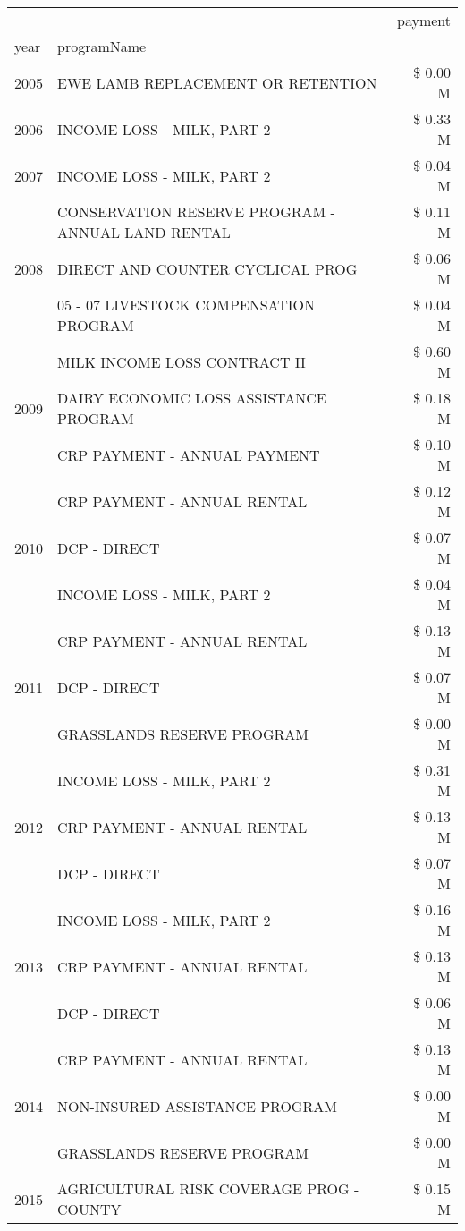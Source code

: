 \begin{tabular}{llr}
\toprule
 &  & payment \\
year & programName &  \\
\midrule
2005 & EWE LAMB REPLACEMENT OR RETENTION & \$ 0.00 M \\
\cline{1-3}
2006 & INCOME LOSS - MILK, PART 2 & \$ 0.33 M \\
\cline{1-3}
2007 & INCOME LOSS - MILK, PART 2 & \$ 0.04 M \\
\cline{1-3}
\multirow[t]{3}{*}{2008} & CONSERVATION RESERVE PROGRAM - ANNUAL LAND RENTAL & \$ 0.11 M \\
 & DIRECT AND COUNTER CYCLICAL PROG & \$ 0.06 M \\
 & 05 - 07 LIVESTOCK COMPENSATION PROGRAM & \$ 0.04 M \\
\cline{1-3}
\multirow[t]{3}{*}{2009} & MILK INCOME LOSS CONTRACT II & \$ 0.60 M \\
 & DAIRY ECONOMIC LOSS ASSISTANCE PROGRAM & \$ 0.18 M \\
 & CRP PAYMENT - ANNUAL PAYMENT & \$ 0.10 M \\
\cline{1-3}
\multirow[t]{3}{*}{2010} & CRP PAYMENT - ANNUAL RENTAL & \$ 0.12 M \\
 & DCP - DIRECT & \$ 0.07 M \\
 & INCOME LOSS - MILK, PART 2 & \$ 0.04 M \\
\cline{1-3}
\multirow[t]{3}{*}{2011} & CRP PAYMENT - ANNUAL RENTAL & \$ 0.13 M \\
 & DCP - DIRECT & \$ 0.07 M \\
 & GRASSLANDS RESERVE PROGRAM & \$ 0.00 M \\
\cline{1-3}
\multirow[t]{3}{*}{2012} & INCOME LOSS - MILK, PART 2 & \$ 0.31 M \\
 & CRP PAYMENT - ANNUAL RENTAL & \$ 0.13 M \\
 & DCP - DIRECT & \$ 0.07 M \\
\cline{1-3}
\multirow[t]{3}{*}{2013} & INCOME LOSS - MILK, PART 2 & \$ 0.16 M \\
 & CRP PAYMENT - ANNUAL RENTAL & \$ 0.13 M \\
 & DCP - DIRECT & \$ 0.06 M \\
\cline{1-3}
\multirow[t]{3}{*}{2014} & CRP PAYMENT - ANNUAL RENTAL & \$ 0.13 M \\
 & NON-INSURED ASSISTANCE PROGRAM & \$ 0.00 M \\
 & GRASSLANDS RESERVE PROGRAM & \$ 0.00 M \\
\cline{1-3}
\multirow[t]{3}{*}{2015} & AGRICULTURAL RISK COVERAGE PROG - COUNTY & \$ 0.15 M \\

\end{tabular}
